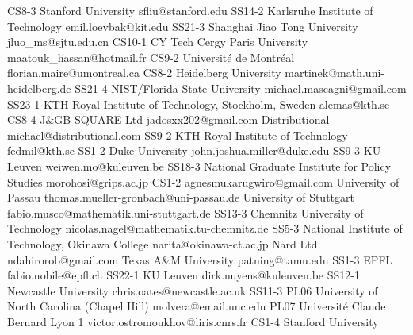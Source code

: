 \begin{multicols}{2}
{CS8-3}
{}
{ Stanford University }
{ sfliu@stanford.edu }
{SS14-2}
{}
{ Karlsruhe Institute of Technology }
{ emil.loevbak@kit.edu }
{SS21-3}
{}
{ Shanghai Jiao Tong University }
{ jluo_ms@sjtu.edu.cn }
{CS10-1}
{}
{ CY Tech Cergy Paris University }
{ maatouk_hassan@hotmail.fr }
{CS9-2}
{}
{ Université de Montréal }
{ florian.maire@umontreal.ca }
{CS8-2}
{}
{ Heidelberg University }
{ martinek@math.uni-heidelberg.de }
{SS21-4}
{}
{ NIST/Florida State University }
{ michael.mascagni@gmail.com }
{SS23-1}
{}
{ KTH Royal Institute of Technology, Stockholm, Sweden }
{ alemas@kth.se }
{CS8-4}
{}
{ J\&GB SQUARE Ltd }
{ jadosxx202@gmail.com }
{}
{}
{ Distributional }
{ michael@distributional.com }
{SS9-2}
{}
{ KTH Royal Institute of Technology }
{ fedmil@kth.se }
{SS1-2}
{}
{ Duke University }
{ john.joshua.miller@duke.edu }
{SS9-3}
{}
{ KU Leuven }
{ weiwen.mo@kuleuven.be }
{SS18-3}
{}
{ National Graduate Institute for Policy Studies }
{ morohosi@grips.ac.jp }
{CS1-2}
{}
{}
{agnesmukarugwiro@gmail.com}
{}
{}
{ University of Passau }
{ thomas.mueller-gronbach@uni-passau.de }
{}
{}
{ University of Stuttgart }
{ fabio.musco@mathematik.uni-stuttgart.de }
{SS13-3}
{}
{ Chemnitz University of Technology }
{ nicolas.nagel@mathematik.tu-chemnitz.de }
{SS5-3}
{}
{ National Institute of Technology, Okinawa College }
{ narita@okinawa-ct.ac.jp }
{}
{}
{ Nard Ltd }
{ ndahirorob@gmail.com }
{}
{}
{ Texas A\&M University }
{ patning@tamu.edu }
{SS1-3}
{}
{ EPFL }
{ fabio.nobile@epfl.ch }
{SS22-1}
{}
{ KU Leuven }
{ dirk.nuyens@kuleuven.be }
{SS12-1}
{}
{ Newcastle University }
{ chris.oates@newcastle.ac.uk }
{SS11-3}
{PL06}
{ University of North Carolina (Chapel Hill) }
{ molvera@email.unc.edu }
{PL07}
{}
{ Université Claude Bernard Lyon 1 }
{ victor.ostromoukhov@liris.cnrs.fr }
{CS1-4}
{}
{ Stanford University }

\end{multicols}
